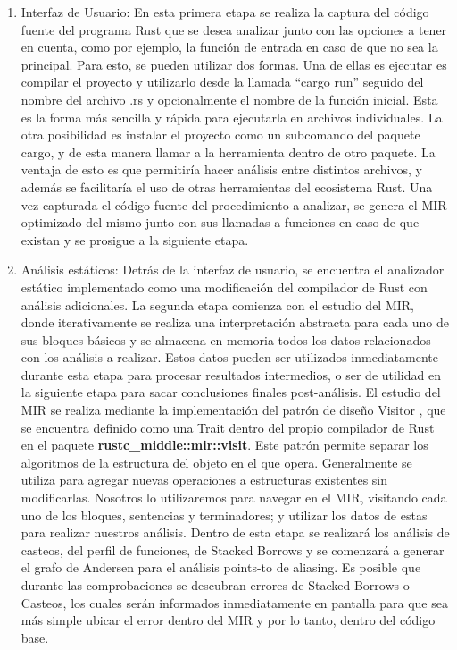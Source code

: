 \begin{enumerate}
    \item Interfaz de Usuario: En esta primera etapa se realiza la captura del código fuente del programa Rust que se desea analizar junto con las opciones a tener en cuenta, como por ejemplo, la función de entrada en caso de que no sea la principal. Para esto, se pueden utilizar dos formas. Una de ellas es ejecutar es compilar el proyecto y utilizarlo desde la llamada ``cargo run'' seguido del nombre del archivo .rs y opcionalmente el nombre de la función inicial. Esta es la forma más sencilla y rápida para ejecutarla en archivos individuales. La otra posibilidad es instalar el proyecto como un subcomando del paquete cargo, y de esta manera llamar a la herramienta dentro de otro paquete. La ventaja de esto es que permitiría hacer análisis entre distintos archivos, y además se facilitaría el uso de otras herramientas del ecosistema Rust. Una vez capturada el código fuente del procedimiento a analizar, se genera el MIR optimizado del mismo junto con sus llamadas a funciones en caso de que existan y se prosigue a la siguiente etapa.
    \item Análisis estáticos: Detrás de la interfaz de usuario, se encuentra el analizador estático implementado como una modificación del compilador de Rust con análisis adicionales. La segunda etapa comienza con el estudio del MIR, donde iterativamente se realiza una interpretación abstracta para cada uno de sus bloques básicos y se almacena en memoria todos los datos relacionados con los análisis a realizar. Estos datos pueden ser utilizados inmediatamente durante esta etapa para procesar resultados intermedios, o ser de utilidad en la siguiente etapa para sacar conclusiones finales post-análisis.
    El estudio del MIR se realiza mediante la implementación del patrón de diseño Visitor \cite{ingienieriasoftware}, que se encuentra definido como una Trait dentro del propio compilador de Rust en el paquete \textbf{rustc\_middle::mir::visit}. Este patrón permite separar los algoritmos de la estructura del objeto en el que opera. Generalmente se utiliza para agregar nuevas operaciones a estructuras existentes sin modificarlas. Nosotros lo utilizaremos para navegar en el MIR, visitando cada uno de los bloques, sentencias y terminadores; y utilizar los datos de estas para realizar nuestros análisis.
    Dentro de esta etapa se realizará los análisis de casteos, del perfil de funciones, de Stacked Borrows y se comenzará a generar el grafo de Andersen para el análisis points-to de aliasing. Es posible que durante las comprobaciones se descubran errores de Stacked Borrows o Casteos, los cuales serán informados inmediatamente en pantalla para que sea más simple ubicar el error dentro del MIR y por lo tanto, dentro del código base.

\end{enumerate}
